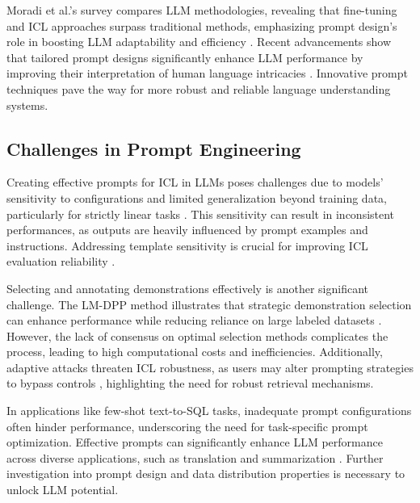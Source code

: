 Moradi et al.'s survey compares LLM methodologies, revealing that fine-tuning and ICL approaches surpass traditional methods, emphasizing prompt design's role in boosting LLM adaptability and efficiency \cite{moradi2024exploringlandscapelargelanguage}. Recent advancements show that tailored prompt designs significantly enhance LLM performance by improving their interpretation of human language intricacies \cite{shi2024promptspaceoptimizingfewshot,tang2024demonstrationnotebookfindingsuited}. Innovative prompt techniques pave the way for more robust and reliable language understanding systems.
\subsection{Challenges in Prompt Engineering} \label{subsec:Challenges in Prompt Engineering}

Creating effective prompts for ICL in LLMs poses challenges due to models' sensitivity to configurations and limited generalization beyond training data, particularly for strictly linear tasks \cite{naim2024reexamininglearninglinearfunctions}. This sensitivity can result in inconsistent performances, as outputs are heavily influenced by prompt examples and instructions. Addressing template sensitivity is crucial for improving ICL evaluation reliability \cite{voronov2024mindformatconsistentevaluation}.

Selecting and annotating demonstrations effectively is another significant challenge. The LM-DPP method illustrates that strategic demonstration selection can enhance performance while reducing reliance on large labeled datasets \cite{wang2024effectivedemonstrationannotationincontext}. However, the lack of consensus on optimal selection methods complicates the process, leading to high computational costs and inefficiencies. Additionally, adaptive attacks threaten ICL robustness, as users may alter prompting strategies to bypass controls \cite{si2024iclguardcontrollingincontextlearning}, highlighting the need for robust retrieval mechanisms.

In applications like few-shot text-to-SQL tasks, inadequate prompt configurations often hinder performance, underscoring the need for task-specific prompt optimization. Effective prompts can significantly enhance LLM performance across diverse applications, such as translation and summarization \cite{shi2024promptspaceoptimizingfewshot,sun2023exploringeffectivefactorsimproving}. Further investigation into prompt design and data distribution properties is necessary to unlock LLM potential.

